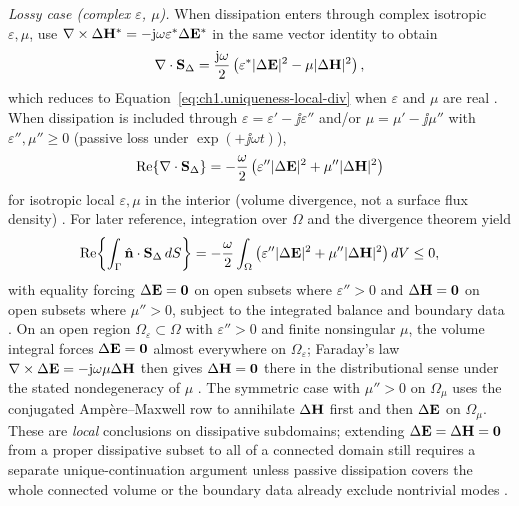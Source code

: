 \emph{Lossy case (complex $\varepsilon$, $\mu$).} When dissipation enters through complex isotropic $\varepsilon,\mu$, use $\nabla\times\Delta\mathbf{H}^*=-\mathrm{j}\omega\varepsilon^*\Delta\mathbf{E}^*$ in the same vector identity to obtain
\begin{equation}
\label{eq:ch1.uniqueness-local-div-complex}
\nabla\cdot\mathbf{S}_\Delta
=\frac{\mathrm{j}\omega}{2}\left(\varepsilon^*|\Delta\mathbf{E}|^{2}-\mu|\Delta\mathbf{H}|^{2}\right),
\end{equation}
which reduces to Equation~\eqref{eq:ch1.uniqueness-local-div} when $\varepsilon$ and $\mu$ are real \cite{stratton1941,harrington2001}. When dissipation is included through $\varepsilon=\varepsilon'-\jj\varepsilon''$ and/or $\mu=\mu'-\jj\mu''$ with $\varepsilon'',\mu''\ge0$ (passive loss under $\exp(+\jj\omega t)$),
\[
\Re\{\nabla\cdot\mathbf{S}_\Delta\}
=-\frac{\omega}{2}\left(\varepsilon''|\Delta\mathbf{E}|^{2}+\mu''|\Delta\mathbf{H}|^{2}\right)
\]
for isotropic local $\varepsilon,\mu$ in the interior (volume divergence, not a surface flux density) \cite{stratton1941,harrington2001}. For later reference, integration over $\Omega$ and the divergence theorem yield
\[
\Re\!\left\{\int_{\Gamma}\hat{\mathbf{n}}\cdot\mathbf{S}_\Delta\,dS\right\}
=-\frac{\omega}{2}\int_{\Omega}\left(\varepsilon''|\Delta\mathbf{E}|^{2}+\mu''|\Delta\mathbf{H}|^{2}\right)dV
\le 0,
\]
with equality forcing $\Delta\mathbf{E}=\mathbf{0}$ on open subsets where $\varepsilon''>0$ and $\Delta\mathbf{H}=\mathbf{0}$ on open subsets where $\mu''>0$, subject to the integrated balance and boundary data \cite{stratton1941,harrington2001}. On an open region $\Omega_\varepsilon\subset\Omega$ with $\varepsilon''>0$ and finite nonsingular $\mu$, the volume integral forces $\Delta\mathbf{E}=\mathbf{0}$ almost everywhere on $\Omega_\varepsilon$; Faraday's law $\nabla\times\Delta\mathbf{E}=-\mathrm{j}\omega\mu\Delta\mathbf{H}$ then gives $\Delta\mathbf{H}=\mathbf{0}$ there in the distributional sense under the stated nondegeneracy of $\mu$ \cite{stratton1941,harrington2001}. The symmetric case with $\mu''>0$ on $\Omega_\mu$ uses the conjugated Amp\`ere--Maxwell row to annihilate $\Delta\mathbf{H}$ first and then $\Delta\mathbf{E}$ on $\Omega_\mu$. These are \emph{local} conclusions on dissipative subdomains; extending $\Delta\mathbf{E}=\Delta\mathbf{H}=\mathbf{0}$ from a proper dissipative subset to all of a connected domain still requires a separate unique-continuation argument unless passive dissipation covers the whole connected volume or the boundary data already exclude nontrivial modes \cite{stratton1941,harrington2001}.

